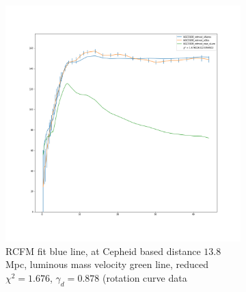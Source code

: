 \documentclass[reprint,%
 amsmath,amssymb,
 aps,
]{revtex4-1}
\begin{document}
 


    

   
   
  
    \begin{figure}[h!] 
    \begin{subfigure}[c]{0.5\linewidth}
    \centering
    \includegraphics[width=0.95\linewidth]{figures/NGC3198_rotmod_XueSofue.png}
    \caption{RCFM fit blue line, at Cepheid based distance $13.8$Mpc,   luminous mass velocity  green line, reduced $\chi^2  =1.676$, $\gamma_d = 0.878$ (rotation curve data \cite{2016Lelli} }
    \label{fig:NGC3198RCFM} 
  \end{subfigure}%
  \begin{subfigure}[c]{0.5\linewidth}
    \centering

\end{subfigure}
\end{figure}
\end{document}
